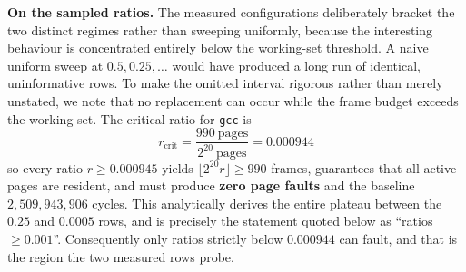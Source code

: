 \documentclass[11pt,a4paper]{article}
\begin{document}
\begin{table}[h]
\centering
\caption{Part IV Results: Memory Constriction, Page Faults, and Execution Slowdown on \texttt{gcc}}
\label{tab:part4_results}
\end{table}

\noindent\textbf{On the sampled ratios.}
The measured configurations deliberately bracket the two distinct regimes rather than sweeping uniformly, because the interesting behaviour is concentrated entirely below the working-set threshold. A naive uniform sweep at $0.5, 0.25, \dots$ would have produced a long run of identical, uninformative rows. To make the omitted interval rigorous rather than merely unstated, we note that no replacement can occur while the frame budget exceeds the working set. The critical ratio for \texttt{gcc} is
\begin{equation}
    r_{\text{crit}} = \frac{990\ \text{pages}}{2^{20}\ \text{pages}} = 0.000944
\end{equation}
so every ratio $r \ge 0.000945$ yields $\lfloor 2^{20} r \rfloor \ge 990$ frames, guarantees that all active pages are resident, and must produce \textbf{zero page faults} and the baseline $2{,}509{,}943{,}906$ cycles. This analytically derives the entire plateau between the $0.25$ and $0.0005$ rows, and is precisely the statement quoted below as ``ratios $\ge 0.001$''. Consequently only ratios strictly below $0.000944$ can fault, and that is the region the two measured rows probe.
\end{document}
